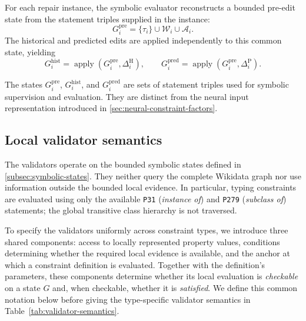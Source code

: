 \documentclass[a4paper,UKenglish,cleveref,autoref,thm-restate]{tgdk-v2021}
\newcommand{\histedit}{\Delta^{\mathrm{H}}}
\newcommand{\prededit}{\Delta^{\mathrm{P}}}
\begin{document}
For each repair instance, the symbolic evaluator reconstructs a bounded pre-edit state from the statement triples supplied in the instance:
\[
G_i^{\mathrm{pre}}=\{\tau_i\}\cup\mathcal{W}_i\cup\mathcal{A}_i.
\]
The historical and predicted edits are applied independently to this common state, yielding
\[
G_i^{\mathrm{hist}}=\operatorname{apply}(G_i^{\mathrm{pre}},\histedit_i),
\qquad
G_i^{\mathrm{pred}}=\operatorname{apply}(G_i^{\mathrm{pre}},\prededit_i).
\]

The states \(G_i^{\mathrm{pre}}\), \(G_i^{\mathrm{hist}}\), and \(G_i^{\mathrm{pred}}\) are sets of statement triples used for symbolic supervision and evaluation. They are distinct from the neural input representation introduced in \cref{sec:neural-constraint-factors}.

\subsection{Local validator semantics}
\label{subsec:validator-semantics}

The validators operate on the bounded symbolic states defined in \cref{subsec:symbolic-states}. They neither query the complete Wikidata graph nor use information outside the bounded local evidence. In particular, typing constraints are evaluated using only the available \texttt{P31} (\emph{instance of}) and \texttt{P279} (\emph{subclass of}) statements; the global transitive class hierarchy is not traversed.

To specify the validators uniformly across constraint types, we introduce three shared components: access to locally represented property values, conditions determining whether the required local evidence is available, and the anchor at which a constraint definition is evaluated. Together with the definition's parameters, these components determine whether its local evaluation is \emph{checkable} on a state \(G\) and, when checkable, whether it is \emph{satisfied}. We define this common notation below before giving the type-specific validator semantics in Table~\ref{tab:validator-semantics}.
\end{document}
